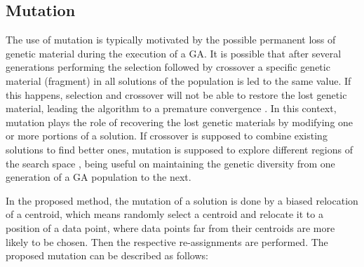 


\subsection{Mutation}
\label{subsec:mutation}
The use of mutation is typically motivated by the possible permanent loss of genetic material during the execution of a GA. It is possible that after several generations performing the selection followed by crossover a specific genetic material (fragment) in all solutions of the population is led to the same value. If this happens, selection and crossover will not be able to restore the lost genetic material, leading the algorithm to a premature convergence \cite{Whitley1994}. In this context, mutation plays the role of recovering the lost genetic materials by modifying one or more portions of a solution. If crossover is supposed to combine existing solutions to find better ones, mutation is supposed to explore different regions of the search space \cite{Abdoun2012}, being useful on maintaining the genetic diversity from one generation of a GA population to the next.

In the proposed method, the mutation of a solution is done by a biased relocation of a centroid, which means randomly select a centroid and relocate it to a position of a data point, where data points far from their centroids are more likely to be chosen. Then the respective re-assignments are performed. The proposed mutation can be described as follows:

